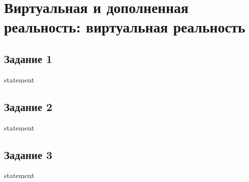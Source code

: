\chapter{Виртуальная и дополненная реальность: виртуальная реальность}

\section{Задание 1}
{statement}

\section{Задание 2}
{statement}

\section{Задание 3}
{statement}